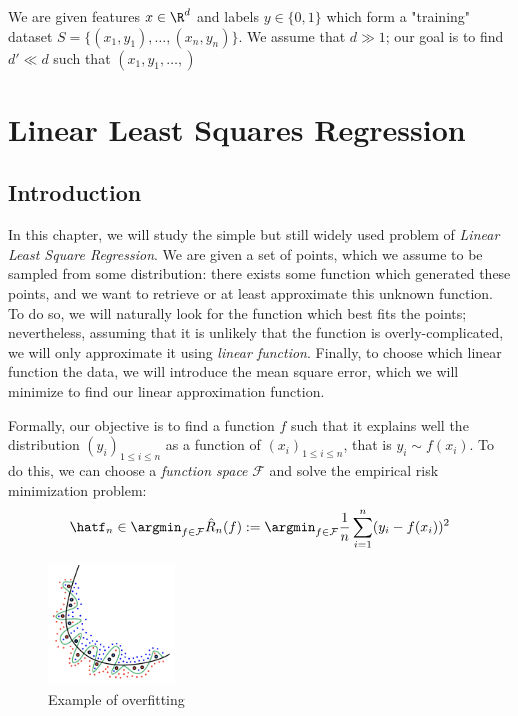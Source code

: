 \documentclass[toc]{../cs-classes/cs-classes}
\begin{document}
\begin{example}
    We are given features $x\in \R^d$ and labels $y\in\{0, 1\}$ which form a "training" dataset $S=\{(x_1, y_1), \dots, (x_n, y_n)\}$. We assume that $d\gg1$; our goal is to find $d'\ll d$ such that $(x_1, y_1, \dots, )$
\end{example}

\section{Linear Least Squares Regression}
\subsection{Introduction}
In this chapter, we will study the simple but still widely used problem of \emph{Linear Least Square Regression}. We are given a set of points, which we assume to be sampled from some distribution: there exists some function which generated these points, and we want to retrieve or at least approximate this unknown function. To do so, we will naturally look for the function which best fits the points; nevertheless, assuming that it is unlikely that the function is overly-complicated, we will only approximate it using \emph{linear function}. Finally, to choose which linear function  the data, we will introduce the mean square error, which we will minimize to find our linear approximation function.

Formally, our objective is to find a function $f$ such that it explains well the distribution $(y_i)_{1\leq i\leq n}$ as a function of $(x_i)_{1\leq i\leq n}$, that is $y_i\sim f(x_i)$. To do this, we can choose a \emph{function space} $\mathcal{F}$ and solve the empirical risk minimization problem:
\begin{equation*}
    \hatf_n \in \argmin_{f\in\mathcal{F}} \hat{R}_n(f) := \argmin_{f\in\mathcal{F}} \frac{1}{n}\sum_{i=1}^n (y_i-f(x_i))^2
\end{equation*}
\begin{figure}
    \includegraphics[width=0.3\textwidth]{images/overfitting.png}
    \caption{Example of overfitting}
\end{figure}
\end{document}
